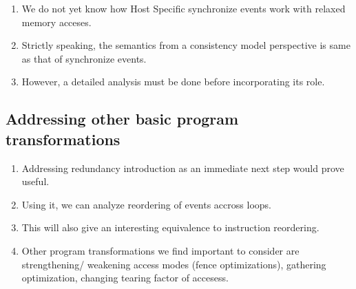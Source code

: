     \begin{enumerate}
        \item We do not yet know how Host Specific synchronize events work with relaxed memory acceses.
        \item Strictly speaking, the semantics from a consistency model perspective is same as that of synchronize events. 
        \item However, a detailed analysis must be done before incorporating its role. 
    \end{enumerate}

    \subsection{Addressing other basic program transformations}
    \begin{enumerate}
        \item Addressing redundancy introduction as an immediate next step would prove useful.
        \item Using it, we can analyze reordering of events accross loops. 
        \item This will also give an interesting equivalence to instruction reordering. 
        \item Other program transformations we find important to consider are strengthening/ weakening access modes (fence optimizations), gathering optimization, changing tearing factor of accesess. 
    \end{enumerate}

    